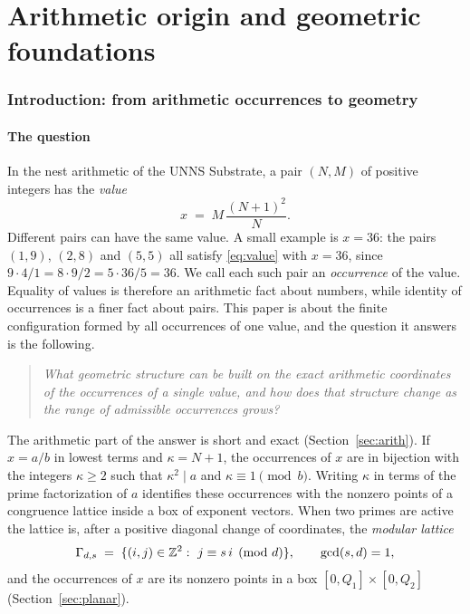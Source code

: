 \part{Arithmetic origin and geometric foundations}

\section{Introduction: from arithmetic occurrences to geometry}\label{sec:intro}

\subsection{The question}

In the nest arithmetic of the UNNS Substrate, a pair $(N,M)$ of positive integers has the \emph{value}
\begin{equation}\label{eq:value}
  x \;=\; M\,\frac{(N+1)^2}{N}.
\end{equation}
Different pairs can have the same value. A small example is $x=36$: the pairs $(1,9)$, $(2,8)$ and $(5,5)$ all satisfy \eqref{eq:value} with $x=36$, since $9\cdot 4/1=8\cdot 9/2=5\cdot 36/5=36$. We call each such pair an \emph{occurrence} of the value. Equality of values is therefore an arithmetic fact about numbers, while identity of occurrences is a finer fact about pairs. This paper is about the finite configuration formed by all occurrences of one value, and the question it answers is the following.

\begin{quote}
\emph{What geometric structure can be built on the exact arithmetic coordinates of the occurrences of a single value, and how does that structure change as the range of admissible occurrences grows?}
\end{quote}

The arithmetic part of the answer is short and exact (Section~\ref{sec:arith}). If $x=a/b$ in lowest terms and $\kappa=N+1$, the occurrences of $x$ are in bijection with the integers $\kappa\ge 2$ such that $\kappa^2\mid a$ and $\kappa\equiv 1 \pmod b$. Writing $\kappa$ in terms of the prime factorization of $a$ identifies these occurrences with the nonzero points of a congruence lattice inside a box of exponent vectors. When two primes are active the lattice is, after a positive diagonal change of coordinates, the \emph{modular lattice}
\[
  \Gamma_{d,s}\;=\;\{(i,j)\in\mathbb Z^2:\ j\equiv s\,i \pmod d\},\qquad \gcd(s,d)=1,
\]
and the occurrences of $x$ are its nonzero points in a box $[0,Q_1]\times[0,Q_2]$ (Section~\ref{sec:planar}).

